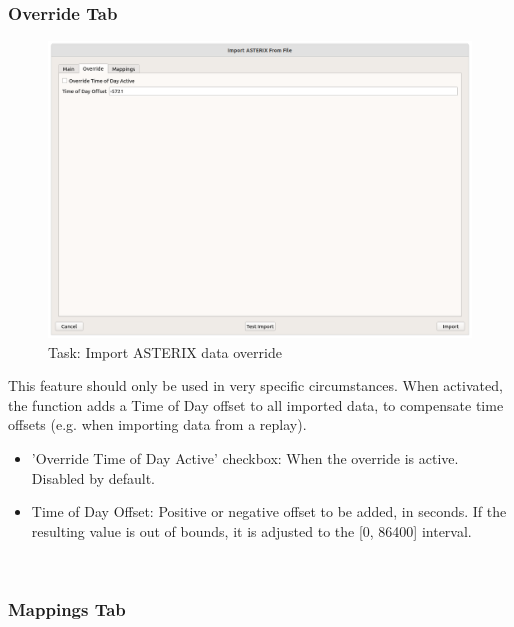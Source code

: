 \subsubsection{Override Tab}
\label{sec:task_import_asterix_override}


\begin{figure}[H]
  \center
    \hspace*{-0.5cm}
    \includegraphics[width=17cm]{figures/asterix_import_data_override.png}
  \caption{Task: Import ASTERIX data override}
\end{figure}

This feature should only be used in very specific circumstances. When activated, the function adds a Time of Day offset to all imported data, to compensate time offsets (e.g. when importing data from a replay). \\

\begin{itemize}
\item 'Override Time of Day Active' checkbox: When the override is active. Disabled by default.
\item Time of Day Offset: Positive or negative offset to be added, in seconds. If the resulting value is out of bounds, it is adjusted to the [0, 86400] interval.
\end{itemize}
\ \\

\subsubsection{Mappings Tab}

